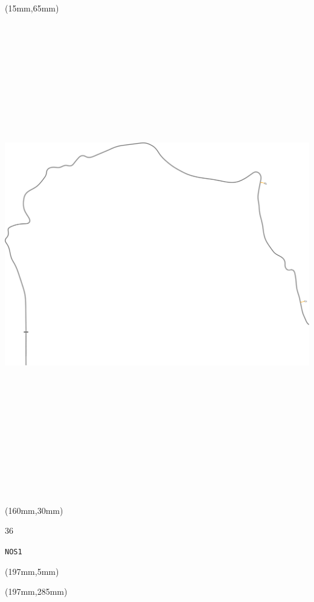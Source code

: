 \begin{textblock*}{185mm}(15mm,65mm)%
\centering
\mbox{\includegraphics[width=185mm,height=210mm,keepaspectratio]{PT/NOS1.pdf}}
\end{textblock*}
\begin{textblock*}{40mm}(160mm,30mm)%
\Large
\par{} 
\par36 
\par\hfill\tiny\tt NOS1\\
\end{textblock*}
\begin{textblock*}{20mm}(197mm,5mm)%
\fbox{\thepage}
\label{NOS1}
\end{textblock*}
\begin{textblock*}{20mm}(197mm,285mm)%
\fbox{\thepage}
\end{textblock*}

